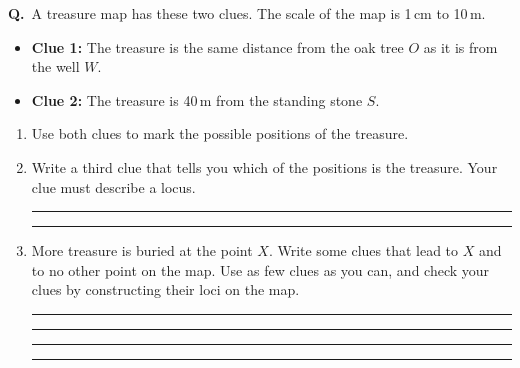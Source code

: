 \documentclass[12pt,a4paper]{article}
\newcounter{qn}
\newcommand{\q}{\refstepcounter{qn}\textbf{Q\theqn.}\ }
\newcommand{\wline}{\par\vspace{16pt}\noindent\rule{\linewidth}{0.4pt}}
\newcommand{\pt}[3]{\fill #1 circle (1.5pt); \node[lab,#2] at #1 {$#3$};}
\newcommand{\place}[3]{\fill #1 circle (1.5pt); \node[lab,#2] at #1 {#3};}
\newenvironment{diagram}{\par\vspace{8pt}\centering}{\par}
\begin{document}
\q A treasure map has these two clues. The scale of the map is 1\,cm
to 10\,m.
\begin{itemize}
  \item[] \textbf{Clue 1:} The treasure is the same distance from the
    oak tree $O$ as it is from the well $W$.
  \item[] \textbf{Clue 2:} The treasure is 40\,m from the standing
    stone $S$.
\end{itemize}

\begin{diagram}
\end{diagram}

\vspace{6pt}
\begin{enumerate}
  \item Use both clues to mark the possible positions of the treasure.
  \item Write a third clue that tells you which of the positions is the
    treasure. Your clue must describe a locus.
    \wline
    \wline
  \item More treasure is buried at the point $X$. Write some clues that
    lead to $X$ and to no other point on the map. Use as few clues as
    you can, and check your clues by constructing their loci on the
    map.
    \wline
    \wline
    \wline
    \wline
\end{enumerate}

\vfill
\end{document}
